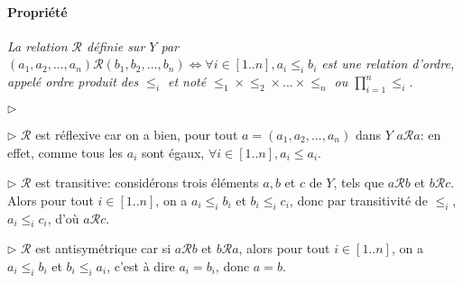 \documentclass{scrartcl}
\begin{document}
			\paragraph{Propriété} \textsl{La relation $\mathcal{R}$ définie sur $Y$ par 
				$(a_1,a_2,...,a_n)\mathcal{R}(b_1,b_2,...,b_n) \Leftrightarrow \forall i \in [1..n], a_i\leq_i b_i$
				est une relation d'ordre, appelé ordre produit des $\leq_i$ et 
				noté $\leq_1\times\leq_2\times...\times\leq_n$ ou $\prod_{i=1}^n\leq_i$.}
			\begin{labeling}{$\triangleright$}
				\item [$\triangleright$] $\mathcal{R}$ est réflexive car on a bien, pour tout $a = (a_1,a_2,...,a_n)$ dans $Y$
					$a\mathcal{R}a$: en effet, comme tous les $a_i$ sont égaux, $\forall i \in [1..n], a_i \leq a_i$.
				\item [$\triangleright$] $\mathcal{R}$ est transitive: considérons trois éléments $a,b$ et $c$ de $Y$,
					tels que $a\mathcal{R}b$ et $b\mathcal{R}c$. Alors pour tout $i \in [1..n]$, on a $a_i\leq_i b_i$
					et $b_i \leq_i c_i$, donc par transitivité de $\leq_i$, $a_i\leq_i c_i$, d'où $a\mathcal{R}c$.
				\item [$\triangleright$] $\mathcal{R}$ est antisymétrique car si $a\mathcal{R}b$ et $b\mathcal{R}a$,
					alors pour tout $i\in [1..n]$, on a $a_i \leq_i b_i$ et $b_i\leq_i a_i$, c'est à dire
					$a_i = b_i$, donc $a=b$.
			\end{labeling}
\end{document}

